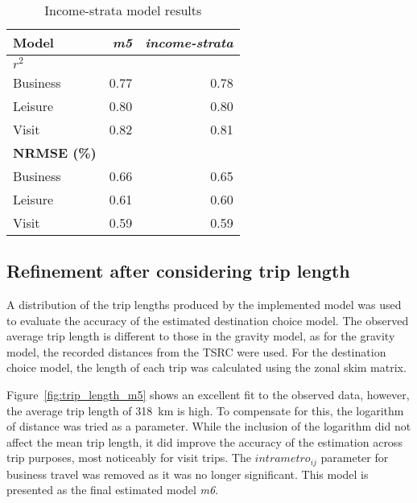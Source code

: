 \begin{table}[H]
\centering
\caption{Income-strata model results}
\label{table:income-strata-results}
\begin{adjustbox}{center}

\begin{tabular}{lrr}
\toprule
\textbf{Model} & \textit{\textbf{m5}} & \textit{\textbf{income-strata}} \\
\midrule
\boldmath{}\textbf{$r^2$}\unboldmath{} &       &   \\
Business & 0.77 & 0.78 \\
Leisure & 0.80 & 0.80\\
Visit  &  0.82 & 0.81\\
\midrule
\textbf{NRMSE (\%)} & & \\
Business  & 0.66 & 0.65 \\
Leisure & 0.61 & 0.60 \\
Visit &  0.59 & 0.59\\
\bottomrule
\end{tabular}%
\end{adjustbox}
\end{table}

\subsection{Refinement after considering trip length}
A distribution of the trip lengths produced by the implemented model was used to evaluate the accuracy of the estimated destination choice model. The observed average trip length is different to those in the gravity model, as for the gravity model, the recorded distances from the TSRC were used. For the destination choice model, the length of each trip was calculated using the zonal skim matrix.

Figure~\ref{fig:trip_length_m5} shows an excellent fit to the observed data, however, the average trip length of 318~km is high. To compensate for this, the logarithm of distance was tried as a parameter. While the inclusion of the logarithm did not affect the mean trip length, it did improve the accuracy of the estimation across trip purposes, most noticeably for visit trips. The $intrametro_{ij}$ parameter for business travel was removed as it was no longer significant. This model is presented as the final estimated model \textit{m6}. 

